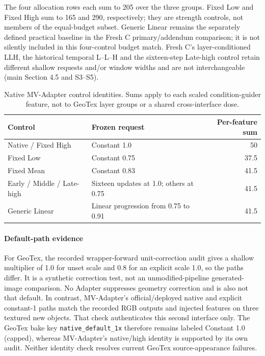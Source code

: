 \documentclass[11pt]{article}
\begin{document}
The four allocation rows each sum to 205 over the three groups. Fixed Low and Fixed High sum to 165 and 290, respectively; they are strength controls, not members of the equal-budget subset. Generic Linear remains the separately defined practical baseline in the Fresh C primary/addendum comparison; it is not silently included in this four-control budget match. Fresh C's layer-conditioned LLH, the historical temporal L--L--H and the sixteen-step Late-high control retain different shallow requests and/or window widths and are not interchangeable (main Section 4.5 and S3--S5).

\begin{table}[ht]
\centering\small
\caption{Native MV-Adapter control identities. Sums apply to each scaled condition-guider feature, not to GeoTex layer groups or a shared cross-interface dose.}\label{tab:control-identity-mva}
\begin{tabular}{p{3.5cm}p{7.0cm}r}
\toprule Control & Frozen request & Per-feature sum \\
\midrule
Native / Fixed High & Constant 1.0 & 50 \\
Fixed Low & Constant 0.75 & 37.5 \\
Fixed Mean & Constant 0.83 & 41.5 \\
Early / Middle / Late-high & Sixteen updates at 1.0; others at 0.75 & 41.5 \\
Generic Linear & Linear progression from 0.75 to 0.91 & 41.5 \\
\bottomrule\end{tabular}
\end{table}

\paragraph{Default-path evidence}
For GeoTex, the recorded wrapper-forward unit-correction audit gives a shallow multiplier of 1.0 for unset scale and 0.8 for an explicit scale 1.0, so the paths differ. It is a synthetic correction test, not an unmodified-pipeline generated-image comparison. No Adapter suppresses geometry correction and is also not that default. In contrast, MV-Adapter's official/deployed native and explicit constant-1 paths match the recorded RGB outputs and injected features on three textured new objects. That check authenticates this second interface only. The GeoTex bake key \texttt{native\_default\_1x} therefore remains labeled Constant 1.0 (capped), whereas MV-Adapter's native/high identity is supported by its own audit. Neither identity check resolves current GeoTex source-appearance failures.
\end{document}
